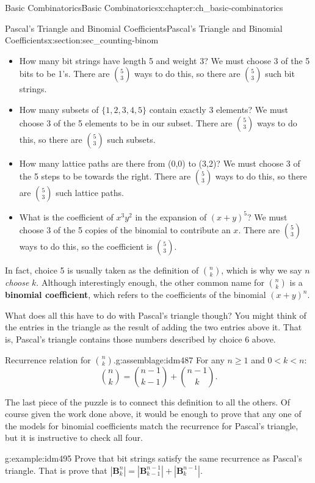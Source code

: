 \documentclass[oneside,10pt,]{book}
\newcommand{\terminology}[1]{\textbf{#1}}
\numberwithin{equation}{chapter}
\def\B{\mathbf{B}}
\newcommand{\lt}{<}
\begin{document}
\begin{chapterptx}{Basic Combinatorics}{}{Basic Combinatorics}{}{}{x:chapter:ch_basic-combinatorics}
\begin{sectionptx}{Pascal's Triangle and Binomial Coefficients}{}{Pascal's Triangle and Binomial Coefficients}{}{}{x:section:sec_counting-binom}
\begin{itemize}[label=\textbullet]
\item{}How many bit strings have length 5 and weight 3?  We must choose \(3\) of the 5 bits to be 1's.  There are \({5 \choose 3}\) ways to do this, so there are \({5 \choose 3}\) such bit strings.%
\item{}How many subsets of \(\{1,2,3,4,5\}\) contain exactly 3 elements?  We must choose \(3\) of the 5 elements to be in our subset.  There are \({5 \choose 3}\) ways to do this, so there are \({5 \choose 3}\) such subsets.%
\item{}How many lattice paths are there from (0,0) to (3,2)?  We must choose 3 of the 5 steps to be towards the right.  There are \({5 \choose 3}\) ways to do this, so there are \({5 \choose 3}\) such lattice paths.%
\item{}What is the coefficient of \(x^3y^2\) in the expansion of \((x+y)^5\)?  We must choose 3 of the 5 copies of the binomial to contribute an \(x\).  There are \({5 \choose 3}\) ways to do this, so the coefficient is \({5 \choose 3}\).%
\end{itemize}
%
\par
In fact, choice 5 is usually taken as the definition of \(\binom{n}{k}\), which is why we say \(n\) \emph{choose} \(k\).  Although interestingly enough, the other common name for \(\binom{n}{k}\) is a \terminology{binomial coefficient}, which refers to the coefficients of the binomial \((x+y)^n\).%
\par
What does all this have to do with Pascal's triangle though?  You might think of the entries in the triangle as the result of adding the two entries above it.  That is, Pascal's triangle contains those numbers described by choice 6 above.%
\begin{assemblage}{Recurrence relation for \({n \choose k}\).}{g:assemblage:idm487}%
For any \(n \ge 1\) and \(0 \lt k \lt n\):%
\begin{equation*}
{n \choose k} = {n-1 \choose k-1} + {n-1 \choose k}.
\end{equation*}
%
\end{assemblage}
The last piece of the puzzle is to connect this definition to all the others.  Of course given the work done above, it would be enough to prove that any one of the models for binomial coefficients match the recurrence for Pascal's triangle, but it is instructive to check all four.%
\begin{example}{}{g:example:idm495}%
Prove that bit strings satisfy the same recurrence as Pascal's triangle.  That is prove that \(|\B^n_k| = |\B^{n-1}_{k-1}| + |\B^{n-1}_k|\).%

\end{example}
\end{sectionptx}
\end{chapterptx}
\end{document}
